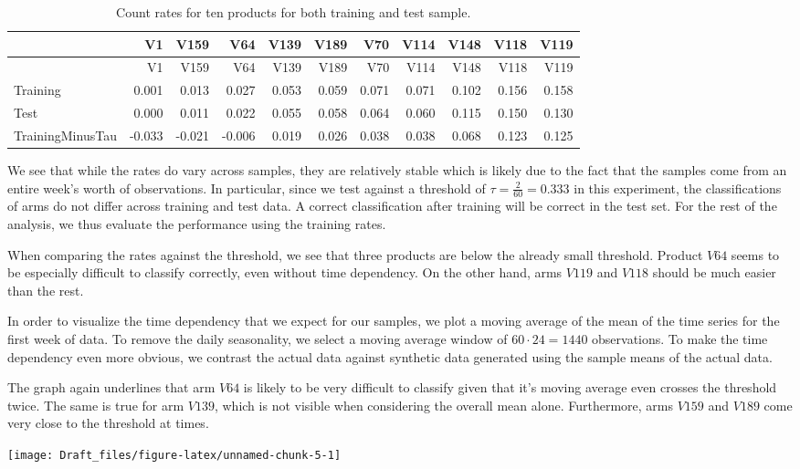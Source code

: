 \documentclass[12pt,]{article}
\begin{document}
\begin{longtable}[]{@{}lrrrrrrrrrr@{}}
\caption{Count rates for ten products for both training and test
sample.}\tabularnewline
\toprule
& V1 & V159 & V64 & V139 & V189 & V70 & V114 & V148 & V118 &
V119\tabularnewline
\midrule
\endfirsthead
\toprule
& V1 & V159 & V64 & V139 & V189 & V70 & V114 & V148 & V118 &
V119\tabularnewline
\midrule
\endhead
Training & 0.001 & 0.013 & 0.027 & 0.053 & 0.059 & 0.071 & 0.071 & 0.102
& 0.156 & 0.158\tabularnewline
Test & 0.000 & 0.011 & 0.022 & 0.055 & 0.058 & 0.064 & 0.060 & 0.115 &
0.150 & 0.130\tabularnewline
TrainingMinusTau & -0.033 & -0.021 & -0.006 & 0.019 & 0.026 & 0.038 &
0.038 & 0.068 & 0.123 & 0.125\tabularnewline
\bottomrule
\end{longtable}

We see that while the rates do vary across samples, they are relatively
stable which is likely due to the fact that the samples come from an
entire week's worth of observations. In particular, since we test
against a threshold of \(\tau = \frac{2}{60} = 0.333\) in this
experiment, the classifications of arms do not differ across training
and test data. A correct classification after training will be correct
in the test set. For the rest of the analysis, we thus evaluate the
performance using the training rates.

When comparing the rates against the threshold, we see that three
products are below the already small threshold. Product \(V64\) seems to
be especially difficult to classify correctly, even without time
dependency. On the other hand, arms \(V119\) and \(V118\) should be much
easier than the rest.

In order to visualize the time dependency that we expect for our
samples, we plot a moving average of the mean of the time series for the
first week of data. To remove the daily seasonality, we select a moving
average window of \(60\cdot24 = 1440\) observations. To make the time
dependency even more obvious, we contrast the actual data against
synthetic data generated using the sample means of the actual data.

The graph again underlines that arm \(V64\) is likely to be very
difficult to classify given that it's moving average even crosses the
threshold twice. The same is true for arm \(V139\), which is not visible
when considering the overall mean alone. Furthermore, arms \(V159\) and
\(V189\) come very close to the threshold at times.

\begin{center}\texttt{[image: Draft\_files/figure-latex/unnamed-chunk-5-1]} \end{center}
\end{document}
